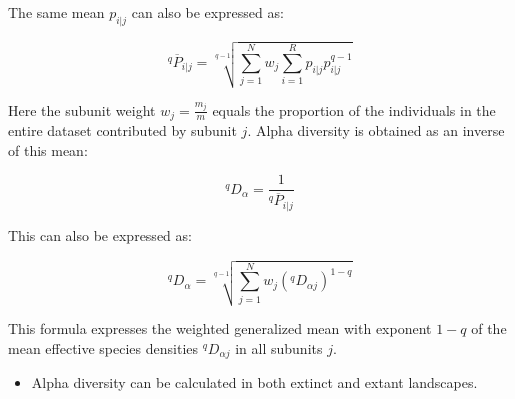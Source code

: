 \documentclass[
  ignorenonframetext,
  aspectratio=169]{beamer}
\providecommand{\tightlist}{%
  \setlength{\itemsep}{0pt}\setlength{\parskip}{0pt}}
\begin{document}
\begin{frame}{}
\protect\hypertarget{section-10}{}
\footnotesize

The same mean \(p_{i|j}\) can also be expressed as:

\[
{}^q \overline{P}_{i|j} = \sqrt[q-1]{\sum^N_{j=1}w_j \sum^R_{i=1} p_{i|j} p^{q-1}_{i|j}}
\]

Here the subunit weight \(w_j = \frac{m_j}{m}\) equals the proportion of
the individuals in the entire dataset contributed by subunit \(j\).
Alpha diversity is obtained as an inverse of this mean:

\[
{}^q D_{\alpha} = \frac{1}{{}^q\overline{P}_{i|j}}
\]

This can also be expressed as:

\[
^q {D}_{\alpha} = \sqrt[q-1]{\sum^N_{j=1}w_j (^q {D}_{\alpha j})^{1-q}}
\]

This formula expresses the weighted generalized mean with exponent
\(1 - q\) of the mean effective species densities \(^q {D}_{\alpha j}\)
in all subunits \(j\).

\begin{itemize}
\tightlist
\item
  Alpha diversity can be calculated in both extinct and extant
  landscapes.
\end{itemize}
\end{frame}
\end{document}

